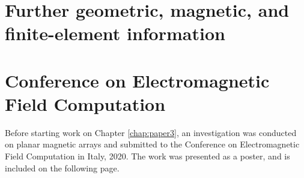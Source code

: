 \documentclass[11pt,a4paper,twoside]{book}
\begin{document}
\chapter{Further geometric, magnetic, and finite-element information}\label{app:geomInfo}

%
\chapter{Conference on Electromagnetic Field Computation}\label{app:CEFC}
Before starting work on Chapter \ref{chap:paper3}, an investigation was conducted on planar magnetic arrays and submitted to the Conference on Electromagnetic Field Computation in Italy, 2020. The work was presented as a poster, and is included on the following page.


\end{document}
